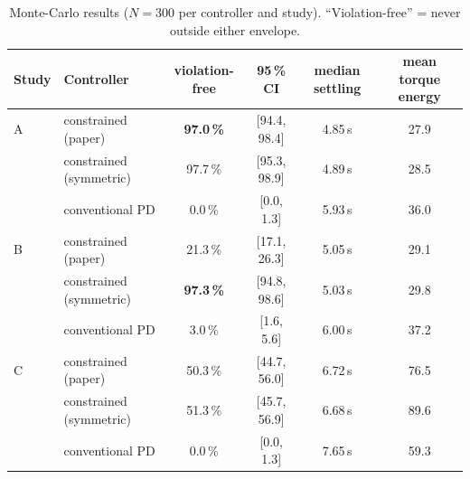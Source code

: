\begin{table}[H]
\centering\small
\setlength{\tabcolsep}{3.5pt}
\caption{Monte-Carlo results ($N=300$ per controller and study). ``Violation-free'' = never outside either envelope.}
\label{tab:mc}
\begin{tabular}{@{}llcccc@{}}
\toprule
\textbf{Study} & \textbf{Controller} & \textbf{violation-free} & \textbf{95\,\% CI} & \textbf{median settling} & \textbf{mean torque energy}\\
\midrule
A & constrained (paper) & \textbf{97.0\,\%} & [94.4, 98.4] & 4.85\,s & 27.9\\
  & constrained (symmetric) & 97.7\,\% & [95.3, 98.9] & 4.89\,s & 28.5\\
  & conventional PD & 0.0\,\% & [0.0, 1.3] & 5.93\,s & 36.0\\
\midrule
B & constrained (paper) & 21.3\,\% & [17.1, 26.3] & 5.05\,s & 29.1\\
  & constrained (symmetric) & \textbf{97.3\,\%} & [94.8, 98.6] & 5.03\,s & 29.8\\
  & conventional PD & 3.0\,\% & [1.6, 5.6] & 6.00\,s & 37.2\\
\midrule
C & constrained (paper) & 50.3\,\% & [44.7, 56.0] & 6.72\,s & 76.5\\
  & constrained (symmetric) & 51.3\,\% & [45.7, 56.9] & 6.68\,s & 89.6\\
  & conventional PD & 0.0\,\% & [0.0, 1.3] & 7.65\,s & 59.3\\
\bottomrule
\end{tabular}
\end{table}

